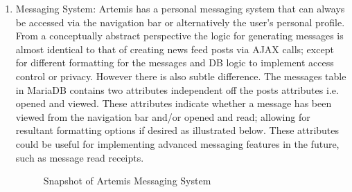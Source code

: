 \begin{enumerate}
    \item Messaging System: Artemis has a personal messaging system that can always be accessed via the navigation bar or alternatively the user's personal profile. From a conceptually abstract perspective the logic for generating messages is almost identical to that of creating news feed posts via AJAX calls; except for different formatting for the messages and DB logic to implement access control or privacy. However there is also subtle difference. The messages table in MariaDB contains two attributes independent off the posts attributes i.e. opened and viewed. These attributes indicate whether a message has been viewed from the navigation bar and/or opened and read; allowing for resultant formatting options if desired as illustrated below. These attributes could be useful for implementing advanced messaging features in the future, such as message read receipts.
    
    \begin{figure}[H]
        \begin{center}
            \caption[Snapshot of Artemis Messaging System]{Snapshot of Artemis Messaging System}
            \label{messagingSystem}
        \end{center}
    \end{figure}
        

\end{enumerate}
